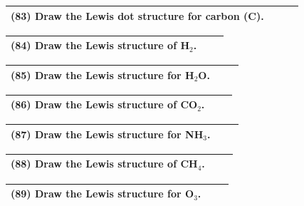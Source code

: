 \documentclass{article}
\begin{document}
\vspace{0.2cm}
\noindent
\begin{tabular}{|p{0.9\linewidth}|}
\hline
\vspace{0.2cm}
\textbf{(83)} Draw the Lewis dot structure for carbon (C). \\
\hline
\end{tabular}

\vspace{0.2cm}
\noindent
\begin{tabular}{|p{0.9\linewidth}|}
\hline
\vspace{0.2cm}
\textbf{(84)} Draw the Lewis structure of H$_2$. \\
\hline
\end{tabular}

\vspace{0.2cm}
\noindent
\begin{tabular}{|p{0.9\linewidth}|}
\hline
\vspace{0.2cm}

\textbf{(85)} Draw the Lewis structure for H$_2$O. \\
\hline
\end{tabular}

\vspace{0.2cm}
\noindent
\begin{tabular}{|p{0.9\linewidth}|}
\hline
\vspace{0.2cm}
\textbf{(86)} Draw the Lewis structure of CO$_2$. \\
\hline
\end{tabular}
\vspace{0.2cm}

\noindent
\begin{tabular}{|p{0.9\linewidth}|}
\hline
\vspace{0.2cm}
\textbf{(87)} Draw the Lewis structure for NH$_3$. \\
\hline
\end{tabular}
\vspace{0.2cm}

\noindent
\begin{tabular}{|p{0.9\linewidth}|}
\hline
\vspace{0.2cm}
\textbf{(88)} Draw the Lewis structure of CH$_4$. \\
\hline
\end{tabular}
\vspace{0.2cm}

\noindent
\begin{tabular}{|p{0.9\linewidth}|}
\hline
\vspace{0.2cm}
\textbf{(89)} Draw the Lewis structure for O$_3$. \\
\hline
\end{tabular}
\vspace{0.2cm}
\end{document}
